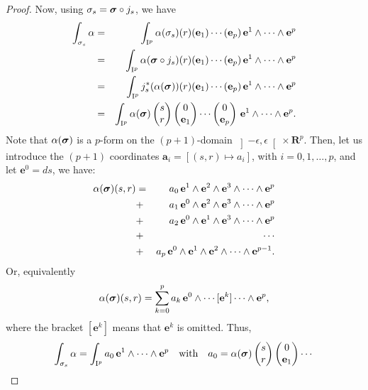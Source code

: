 \documentclass[11pt,reqno]{amsart}
\theoremstyle{definition}
\newcommand{\qmbox}[1]{\quad \mbox{#1}\quad}
\newcommand{\RR}{{\mathbf R}}
\renewcommand{\aa}{{\mathbf a}}
\newcommand{\ee}{{\mathbf e}}
\newcommand{\bsigma}{\mbox{\boldmath $\sigma$}}
\newcommand{\cub}[1]{{\rm I}^{#1}}
\newcommand{\openinterval}[1]{\left] #1 \right[}
\begin{document}
\begin{proof}
    Now, using $\sigma_s = \bsigma \circ j_s$, we have 
    \begin{eqnarray*}
      \int_{\sigma_s}\alpha
      & = & \int_{\cub{p}} \alpha(\sigma_s)(r)(\ee_1) \cdots
      (\ee_p)\,\ee^1\wedge\cdots \wedge \ee^p \\ 
      & = & \int_{\cub{p}} \alpha(\bsigma \circ
      j_s)(r)(\ee_1)\cdots(\ee_p)\, \ee^1\wedge\cdots \wedge
      \ee^p \\
      & = & \int_{\cub{p}}
      j_s^*(\alpha(\bsigma))(r)(\ee_1)\cdots(\ee_p)\,
      \ee^1\wedge\cdots \wedge \ee^p \\ & = & \int_{\cub{p}}
      \alpha(\bsigma)\begin{pmatrix}s\\ r\end{pmatrix} \begin{pmatrix}0\\ \ee_1\end{pmatrix} \cdots
      \begin{pmatrix}0\\ \ee_p\end{pmatrix}\,\ee^1\wedge\cdots \wedge \ee^p.
    \end{eqnarray*}
    Note that $\alpha(\bsigma)$ is a $p$-form on the
    $(p+1)$-domain  $\openinterval{-\epsilon,\epsilon} \times
      \RR^p$. Then, let us introduce the $(p+1)$
    coordinates $\aa_i = [(s,r) \mapsto a_i]$, with $i =
      0, 1,\ldots, p$, and let $\ee^0 = ds$, we have:
    \begin{eqnarray*}
      \alpha(\bsigma)(s,r) & = & a_0\, \ee^1 \wedge \ee^2\wedge
      \ee^3\wedge \cdots \wedge \ee^p \\
      &+& a_1\, \ee^0 \wedge \ee^2\wedge \ee^3\wedge \cdots
      \wedge \ee^p \\
      &+& a_2\, \ee^0 \wedge \ee^1\wedge \ee^3\wedge \cdots
      \wedge \ee^p \\
      &+&\cdots \\ &+& a_p\, \ee^0 \wedge \ee^1\wedge
      \ee^2\wedge \cdots \wedge \ee^{p-1}.
    \end{eqnarray*}
    Or, equivalently
    $$
      \alpha(\bsigma)(s,r) = \sum_{k = 0}^p a_k \, \ee^0\wedge
      \cdots [\ee^k] \cdots \wedge \ee^p,
      $$
    where the bracket
    $[\ee^k]$ means that $\ee^k$ is omitted. 
    Thus,
    $$
      \int_{\sigma_s}\alpha = \int_{\cub{p}} a_0 \,
      \ee^1\wedge\cdots \wedge \ee^p \qmbox{with} a_0 = 
      \alpha(\bsigma)\begin{pmatrix}s\\ r\end{pmatrix} \begin{pmatrix}0\\ \ee_1\end{pmatrix} \cdots
$$
\end{proof}
\end{document}
